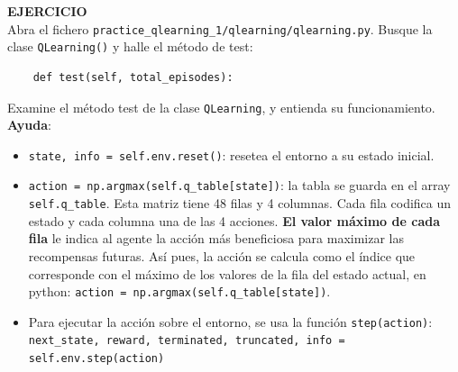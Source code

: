 \documentclass{article}
\begin{document}
\begin{exercise}
\textbf{EJERCICIO}\\
Abra el fichero \texttt{practice\_qlearning\_1/qlearning/qlearning.py}. Busque la clase \texttt{QLearning()} y halle el método de test:
\begin{verbatim}
    def test(self, total_episodes):
\end{verbatim}
Examine el método test de la clase \texttt{QLearning}, y entienda su funcionamiento. \textbf{Ayuda}:
\begin{itemize}
    \item \texttt{state, info = self.env.reset()}: resetea el entorno a su estado inicial.
    \item \texttt{action = np.argmax(self.q\_table[state])}: la tabla se guarda en el array \texttt{self.q\_table}. Esta matriz tiene 48 filas y 4 columnas. Cada fila codifica un estado y cada columna una de las 4 acciones. \textbf{El valor máximo de cada fila} le indica al agente la acción más beneficiosa para maximizar las recompensas futuras. Así pues, la acción se calcula como el índice que corresponde con el máximo de los valores de la fila del estado actual, en python: \texttt{action = np.argmax(self.q\_table[state])}.
    \item Para ejecutar la acción sobre el entorno, se usa la función \texttt{step(action)}: \texttt{next\_state, reward, terminated, truncated, info = self.env.step(action)}
\end{itemize}
\end{exercise}
\end{document}
